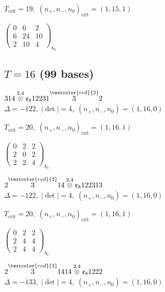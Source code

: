 \documentclass[10pt]{article}
\begin{document}
\hspace{1em}$T_{\text{crit}}=19,\; (n_+,n_-,n_0)_{\text{crit}}=(1,15,1)$

\hspace{2em}$\left(\begin{smallmatrix}0 & 6 & 2 \\ 6 & 24 & 10 \\ 2 & 10 & 4\end{smallmatrix}\right)_{\!b_0}$


\subsection*{$T = 16$ \quad (99 bases)}
\smallskip

$314\overset{2,4}{\otimes}\mathfrak{e}_812231\overset{\textcolor{red}{2}}{3}2$ \quad $\Delta=-122,\; |\det|=4,\; (n_+,n_-,n_0)=(1,16,0)$

\hspace{1em}$T_{\text{crit}}=20,\; (n_+,n_-,n_0)_{\text{crit}}=(1,16,1)$

\hspace{2em}$\left(\begin{smallmatrix}0 & 2 & 2 \\ 2 & 0 & 2 \\ 2 & 2 & 4\end{smallmatrix}\right)_{\!b_0}$

\smallskip

$2\overset{\textcolor{red}{2}}{3}14\overset{2,4}{\otimes}\mathfrak{e}_8122313$ \quad $\Delta=-122,\; |\det|=4,\; (n_+,n_-,n_0)=(1,16,0)$

\hspace{1em}$T_{\text{crit}}=20,\; (n_+,n_-,n_0)_{\text{crit}}=(1,16,1)$

\hspace{2em}$\left(\begin{smallmatrix}0 & 2 & 2 \\ 2 & 4 & 4 \\ 2 & 4 & 4\end{smallmatrix}\right)_{\!b_0}$

\smallskip

$2\overset{\textcolor{red}{2}}{3}1414\overset{2,4}{\otimes}\mathfrak{e}_81222$ \quad $\Delta=-133,\; |\det|=4,\; (n_+,n_-,n_0)=(1,16,0)$
\end{document}
